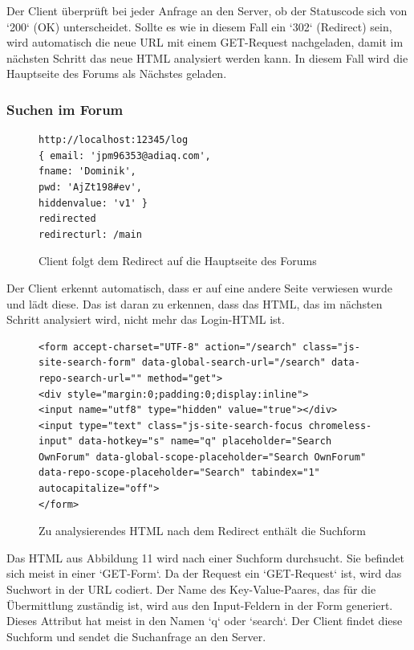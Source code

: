 Der Client überprüft bei jeder Anfrage an den Server, ob der Statuscode sich von `200` (OK) unterscheidet. Sollte es wie in diesem Fall ein `302` (Redirect) sein, wird automatisch die neue URL mit einem GET-Request nachgeladen, damit im nächsten Schritt das neue HTML analysiert werden kann. In diesem Fall wird die Hauptseite des Forums als Nächstes geladen.

\subsubsection{Suchen im Forum}

\begin{figure}[ht]
\begin{lstlisting}[language=HTML5]
http://localhost:12345/log
{ email: 'jpm96353@adiaq.com',
fname: 'Dominik',
pwd: 'AjZt198#ev',
hiddenvalue: 'v1' }
redirected
redirecturl: /main
\end{lstlisting}
\caption{Client folgt dem Redirect auf die Hauptseite des Forums}
\end{figure}

Der Client erkennt automatisch, dass er auf eine andere Seite verwiesen wurde und lädt diese. Das ist daran zu erkennen, dass das HTML, das im nächsten Schritt analysiert wird, nicht mehr das Login-HTML ist.

\begin{figure}[h!]
\begin{lstlisting}[language=HTML5]
<form accept-charset="UTF-8" action="/search" class="js-site-search-form" data-global-search-url="/search" data-repo-search-url="" method="get">
<div style="margin:0;padding:0;display:inline">
<input name="utf8" type="hidden" value="true"></div>
<input type="text" class="js-site-search-focus chromeless-input" data-hotkey="s" name="q" placeholder="Search OwnForum" data-global-scope-placeholder="Search OwnForum" data-repo-scope-placeholder="Search" tabindex="1" autocapitalize="off">
</form>
\end{lstlisting}
\caption{Zu analysierendes HTML nach dem Redirect enthält die Suchform}
\end{figure}

Das HTML aus Abbildung 11 wird nach einer Suchform durchsucht. Sie befindet sich meist in einer `GET-Form`. Da der Request ein `GET-Request` ist, wird das Suchwort in der URL codiert. Der Name des Key-Value-Paares, das für die Übermittlung zuständig ist, wird aus den Input-Feldern in der Form generiert. Dieses Attribut hat meist in den Namen `q` oder `search`. Der Client findet diese Suchform und sendet die Suchanfrage an den Server.


